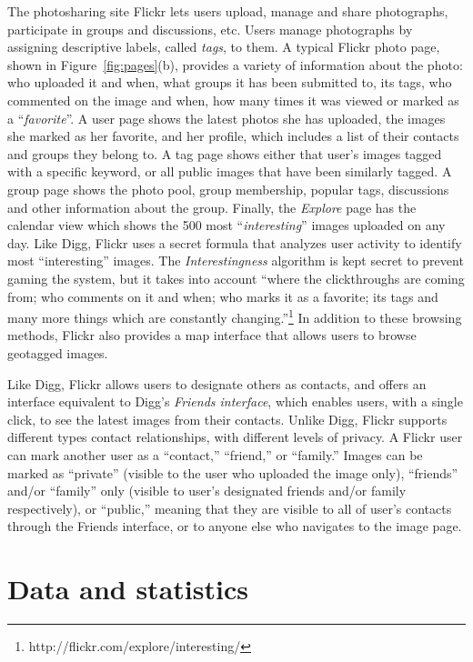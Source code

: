 \documentclass[]{article}
\newcommand{\figref}[1]{Figure~\ref{#1}}
\begin{document}
The photosharing site Flickr lets users upload,
manage and share photographs, participate in groups and discussions, etc.
Users manage photographs by assigning descriptive labels, called
\emph{tags}, to them.
A typical Flickr photo page, shown in \figref{fig:pages}(b), provides a variety
of information about the photo: who uploaded it and when, what
groups it has been submitted to, its tags, who commented on the
image and when, how many times it was viewed or marked as a
``\emph{favorite}''. A user page shows the latest photos she has
uploaded, the images she marked as her favorite, and
her profile, which includes a list of their contacts and
groups they belong to. A tag page shows either that user's images
tagged with a specific keyword, or all public images that have been
similarly tagged. A group page shows the photo pool, group
membership, popular tags, discussions and other information about
the group. Finally, the \emph{Explore} page has the calendar view which
shows the 500 most ``\emph{interesting}'' images uploaded on any day.
Like Digg, Flickr uses a secret formula that analyzes user activity
to identify most ``interesting'' images.
The \emph{Interestingness} algorithm is kept secret to prevent gaming
the system, but it takes into account ``where the
clickthroughs are coming from; who comments on it and when; who
marks it as a favorite; its tags and many more things which are
constantly
changing.''\footnote{http://flickr.com/explore/interesting/} In
addition to these browsing methods, Flickr also provides a map
interface that allows users to browse geotagged images.

Like Digg, Flickr allows users to designate others as contacts,
and offers an interface equivalent to Digg's \emph{Friends interface},
which enables users, with a single click, to see the latest images from their
contacts. Unlike Digg, Flickr supports different types contact
relationships, with different levels of privacy. A Flickr user can
mark another user as  a ``contact,'' ``friend,'' or ``family.'' Images
can be marked as ``private'' (visible to the user who uploaded the image only),
``friends'' and/or ``family'' only (visible to user's designated friends
and/or family respectively), or ``public,'' meaning that they
are visible to all of user's contacts through the Friends interface,
or to anyone else who navigates to the image page.

\section{Data and statistics}
\label{sec:data}
\end{document}
